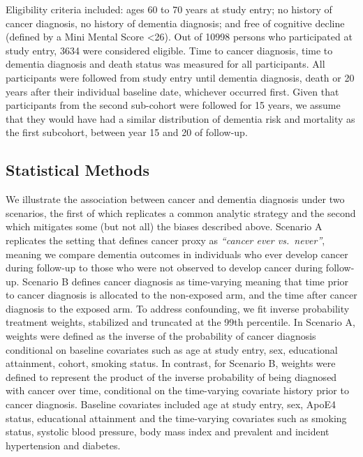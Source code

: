 \documentclass[
]{book}
\begin{document}
Eligibility criteria included: ages 60 to 70 years at study entry; no history of cancer diagnosis, no history of dementia diagnosis; and free of cognitive decline (defined by a Mini Mental Score \textless26). Out of 10998 persons who participated at study entry, 3634 were considered eligible. Time to cancer diagnosis, time to dementia diagnosis and death status was measured for all participants. All participants were followed from study entry until dementia diagnosis, death or 20 years after their individual baseline date, whichever occurred first. Given that participants from the second sub-cohort were followed for 15 years, we assume that they would have had a similar distribution of dementia risk and mortality as the first subcohort, between year 15 and 20 of follow-up.

\hypertarget{statistical-methods}{%
\subsection{Statistical Methods}\label{statistical-methods}}

We illustrate the association between cancer and dementia diagnosis under two scenarios, the first of which replicates a common analytic strategy and the second which mitigates some (but not all) the biases described above. Scenario A replicates the setting that defines cancer proxy as \emph{``cancer ever vs.~never''}\autocite{driver2012}, meaning we compare dementia outcomes in individuals who ever develop cancer during follow-up to those who were not observed to develop cancer during follow-up. Scenario B defines cancer diagnosis as time-varying meaning that time prior to cancer diagnosis is allocated to the non-exposed arm, and the time after cancer diagnosis to the exposed arm. To address confounding, we fit inverse probability treatment weights, stabilized and truncated at the 99th percentile. In Scenario A, weights were defined as the inverse of the probability of cancer diagnosis conditional on baseline covariates such as age at study entry, sex, educational attainment, cohort, smoking status. In contrast, for Scenario B, weights were defined to represent the product of the inverse probability of being diagnosed with cancer over time, conditional on the time-varying covariate history prior to cancer diagnosis\autocite{hernan2000}. Baseline covariates included age at study entry, sex, ApoE4 status, educational attainment and the time-varying covariates such as smoking status, systolic blood pressure, body mass index and prevalent and incident hypertension and diabetes.
\end{document}

